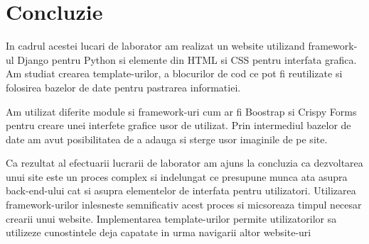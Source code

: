 \section*{Concluzie}



	In cadrul acestei lucari de laborator am realizat un website utilizand framework-ul Django pentru Python si elemente din HTML si CSS pentru interfata grafica. Am studiat crearea template-urilor, a blocurilor de cod ce pot fi reutilizate si folosirea bazelor de date pentru pastrarea informatiei.
	
	Am utilizat diferite module si framework-uri cum ar fi Boostrap si Crispy Forms pentru creare unei interfete grafice usor de utilizat. Prin intermediul bazelor de date am avut posibilitatea de a adauga si sterge usor imaginile de pe site.


	Ca rezultat al efectuarii lucrarii de laborator am ajuns la concluzia ca dezvoltarea unui site este un proces complex si indelungat ce presupune munca ata asupra back-end-ului cat si asupra elementelor de interfata pentru utilizatori. Utilizarea framework-urilor inlesneste semnificativ acest proces si micsoreaza timpul necesar crearii unui website. Implementarea template-urilor permite utilizatorilor sa utilizeze cunostintele deja capatate in urma navigarii altor website-uri

\clearpage